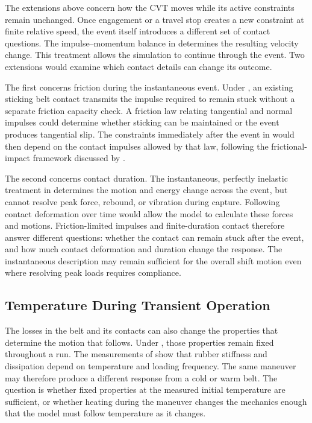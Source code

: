 \documentclass[11pt]{report}
\numberwithin{equation}{section}
\newcounter{assump}
\begin{document}
The extensions above concern how the CVT moves while its active constraints
remain unchanged. Once engagement or a travel stop creates a new constraint at
finite relative speed, the event itself introduces a different set of contact
questions. The impulse--momentum balance in
 determines the resulting
velocity change. This treatment allows the simulation to continue through the
event. Two extensions would examine which contact details can change its
outcome.

The first concerns friction during the instantaneous event. Under
, an existing sticking belt contact
transmits the impulse required to remain stuck without a separate friction
capacity check. A friction law relating tangential and normal impulses could
determine whether sticking can be maintained or the event produces tangential
slip. The constraints immediately after the event in
 would then depend on the contact
impulses allowed by that law, following the frictional-impact framework
discussed by \citet{Stewart2000RigidImpact}.

The second concerns contact duration. The instantaneous, perfectly inelastic
treatment in  determines the
motion and energy change across the event, but cannot resolve peak force,
rebound, or vibration during capture. Following contact deformation over time
would allow the model to calculate these forces and motions. Friction-limited
impulses and finite-duration contact therefore answer different questions:
whether the contact can remain stuck after the event, and how much contact
deformation and duration change the response. The instantaneous description
may remain sufficient for the overall shift motion even where resolving peak
loads requires compliance.

\subsection*{Temperature During Transient Operation}
\label{sec:future_work_temperature}

The losses in the belt and its contacts can also change the properties that
determine the motion that follows. Under
, those properties remain fixed
throughout a run. The measurements of \citet{Messick2018} show that rubber
stiffness and dissipation depend on temperature and loading frequency. The
same maneuver may therefore produce a different response from a cold or warm
belt. The question is whether fixed properties at the measured initial
temperature are sufficient, or whether heating during the maneuver changes the
mechanics enough that the model must follow temperature as it changes.
\end{document}
